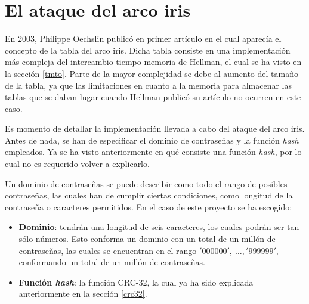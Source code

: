 \documentclass[12pt,spanish,listoffigures,listoftables]{tfgetsinf}
\newcommand{\hash}{\textit{hash}}
\begin{document}





\chapter{El ataque del arco iris}

En 2003, Philippe Oechslin \cite{rainbow} publicó en primer artículo en el cual aparecía el concepto de la tabla del arco iris. Dicha tabla consiste en una implementación más compleja del intercambio tiempo-memoria de Hellman, el cual se ha visto en la sección \ref{tmto}. Parte de la mayor complejidad se debe al aumento del tamaño de la tabla, ya que las limitaciones en cuanto a la memoria para almacenar las tablas que se daban lugar cuando Hellman publicó su artículo no ocurren en este caso.

Es momento de detallar la implementación llevada a cabo del ataque del arco iris. Antes de nada, se han de especificar el dominio de contraseñas y la función \hash~ empleados. Ya se ha visto anteriormente en qué consiste una función \hash, por lo cual no es requerido volver a explicarlo.

Un dominio de contraseñas se puede describir como todo el rango de posibles contraseñas, las cuales han de cumplir ciertas condiciones, como longitud de la contraseña o caracteres permitidos. En el caso de este proyecto se ha escogido:

\begin{itemize}

    \item \textbf{Dominio}: tendrán una longitud de seis caracteres, los cuales podrán ser tan sólo números. Esto conforma un dominio con un total de un millón de contraseñas, las cuales se encuentran en el rango $'000000',~\dots, '999999'$, conformando un total de un millón de contraseñas.
    
    \item \textbf{Función \hash}: la función CRC-32, la cual ya ha sido explicada anteriormente en la sección \ref{crc32}.
    
\end{itemize}
\end{document}
